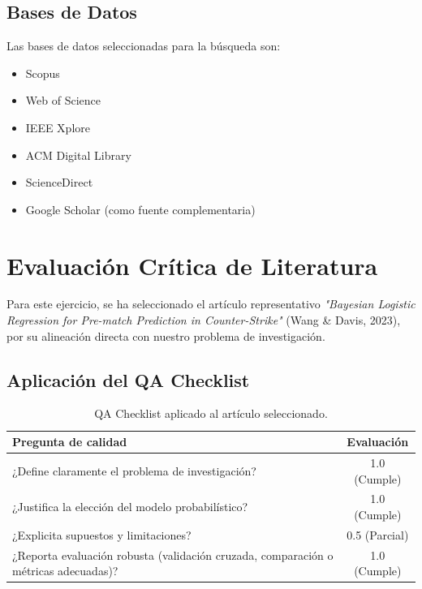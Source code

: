 \documentclass{article}
\begin{document}
\subsection{Bases de Datos}

Las bases de datos seleccionadas para la búsqueda son:

\begin{itemize}
    \item Scopus
    \item Web of Science
    \item IEEE Xplore
    \item ACM Digital Library
    \item ScienceDirect
    \item Google Scholar (como fuente complementaria)
\end{itemize}

\section{Evaluación Crítica de Literatura}

Para este ejercicio, se ha seleccionado el artículo representativo \textit{"Bayesian Logistic Regression for Pre-match Prediction in Counter-Strike"} (Wang \& Davis, 2023), por su alineación directa con nuestro problema de investigación.

\subsection{Aplicación del QA Checklist}

\begin{table}[H]
\centering
\begin{tabular}{|p{11cm}|c|}
\hline
\textbf{Pregunta de calidad} & \textbf{Evaluación} \\
\hline
¿Define claramente el problema de investigación? & 1.0 (Cumple) \\
\hline
¿Justifica la elección del modelo probabilístico? & 1.0 (Cumple) \\
\hline
¿Explicita supuestos y limitaciones? & 0.5 (Parcial) \\
\hline
¿Reporta evaluación robusta (validación cruzada, comparación o métricas adecuadas)? & 1.0 (Cumple) \\
\hline
\end{tabular}
\caption{QA Checklist aplicado al artículo seleccionado.}
\label{tab:qa_aplicado}
\end{table}
\end{document}
